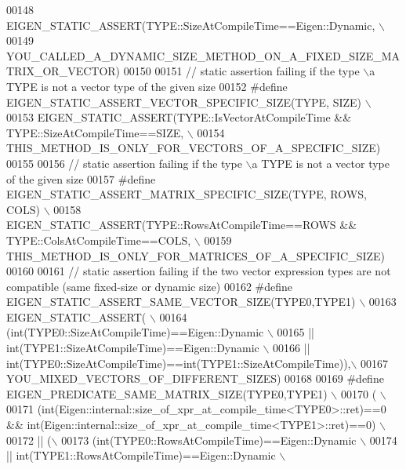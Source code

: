 \begin{DoxyCode}
00148 \textcolor{preprocessor}{  EIGEN\_STATIC\_ASSERT(TYPE::SizeAtCompileTime==Eigen::Dynamic, \(\backslash\)}
00149 \textcolor{preprocessor}{                      YOU\_CALLED\_A\_DYNAMIC\_SIZE\_METHOD\_ON\_A\_FIXED\_SIZE\_MATRIX\_OR\_VECTOR)}
00150 
00151 \textcolor{comment}{// static assertion failing if the type \(\backslash\)a TYPE is not a vector type of the given size}
00152 \textcolor{preprocessor}{#define EIGEN\_STATIC\_ASSERT\_VECTOR\_SPECIFIC\_SIZE(TYPE, SIZE) \(\backslash\)}
00153 \textcolor{preprocessor}{  EIGEN\_STATIC\_ASSERT(TYPE::IsVectorAtCompileTime && TYPE::SizeAtCompileTime==SIZE, \(\backslash\)}
00154 \textcolor{preprocessor}{                      THIS\_METHOD\_IS\_ONLY\_FOR\_VECTORS\_OF\_A\_SPECIFIC\_SIZE)}
00155 
00156 \textcolor{comment}{// static assertion failing if the type \(\backslash\)a TYPE is not a vector type of the given size}
00157 \textcolor{preprocessor}{#define EIGEN\_STATIC\_ASSERT\_MATRIX\_SPECIFIC\_SIZE(TYPE, ROWS, COLS) \(\backslash\)}
00158 \textcolor{preprocessor}{  EIGEN\_STATIC\_ASSERT(TYPE::RowsAtCompileTime==ROWS && TYPE::ColsAtCompileTime==COLS, \(\backslash\)}
00159 \textcolor{preprocessor}{                      THIS\_METHOD\_IS\_ONLY\_FOR\_MATRICES\_OF\_A\_SPECIFIC\_SIZE)}
00160 
00161 \textcolor{comment}{// static assertion failing if the two vector expression types are not compatible (same fixed-size or
       dynamic size)}
00162 \textcolor{preprocessor}{#define EIGEN\_STATIC\_ASSERT\_SAME\_VECTOR\_SIZE(TYPE0,TYPE1) \(\backslash\)}
00163 \textcolor{preprocessor}{  EIGEN\_STATIC\_ASSERT( \(\backslash\)}
00164 \textcolor{preprocessor}{      (int(TYPE0::SizeAtCompileTime)==Eigen::Dynamic \(\backslash\)}
00165 \textcolor{preprocessor}{    || int(TYPE1::SizeAtCompileTime)==Eigen::Dynamic \(\backslash\)}
00166 \textcolor{preprocessor}{    || int(TYPE0::SizeAtCompileTime)==int(TYPE1::SizeAtCompileTime)),\(\backslash\)}
00167 \textcolor{preprocessor}{    YOU\_MIXED\_VECTORS\_OF\_DIFFERENT\_SIZES)}
00168 
00169 \textcolor{preprocessor}{#define EIGEN\_PREDICATE\_SAME\_MATRIX\_SIZE(TYPE0,TYPE1) \(\backslash\)}
00170 \textcolor{preprocessor}{     ( \(\backslash\)}
00171 \textcolor{preprocessor}{        (int(Eigen::internal::size\_of\_xpr\_at\_compile\_time<TYPE0>::ret)==0 &&
       int(Eigen::internal::size\_of\_xpr\_at\_compile\_time<TYPE1>::ret)==0) \(\backslash\)}
00172 \textcolor{preprocessor}{    || (\(\backslash\)}
00173 \textcolor{preprocessor}{          (int(TYPE0::RowsAtCompileTime)==Eigen::Dynamic \(\backslash\)}
00174 \textcolor{preprocessor}{        || int(TYPE1::RowsAtCompileTime)==Eigen::Dynamic \(\backslash\)}

\end{DoxyCode}
